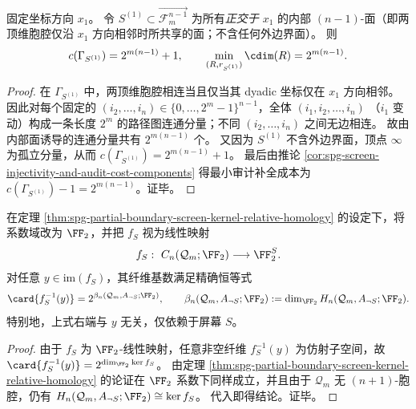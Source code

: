 \begin{proposition}\label{prop:spg-axial-screen-area-law-audit-cost}
固定坐标方向 \(x_1\)。
令 \(S^{(1)}\subset \overrightarrow{\mathcal F_{m}^{n-1}}\) 为所有\emph{正交于 \(x_1\)} 的内部 \((n-1)\)-面（即两顶维胞腔仅沿 \(x_1\) 方向相邻时所共享的面；不含任何外边界面）。
则
\[
c(\Gamma_{S^{(1)}})=2^{m(n-1)}+1,
\qquad
\min_{(R,r_{S^{(1)}})}\cdim(R)=2^{m(n-1)}.
\]
\end{proposition}
\begin{proof}
在 \(\Gamma_{S^{(1)}}\) 中，两顶维胞腔相连当且仅当其 dyadic 坐标仅在 \(x_1\) 方向相邻。
因此对每个固定的 \((i_2,\dots,i_n)\in\{0,\dots,2^m-1\}^{n-1}\)，全体
\(
(i_1,i_2,\dots,i_n)
\)
（\(i_1\) 变动）构成一条长度 \(2^m\) 的路径图连通分量；不同 \((i_2,\dots,i_n)\) 之间无边相连。
故由内部面诱导的连通分量共有 \(2^{m(n-1)}\) 个。
又因为 \(S^{(1)}\) 不含外边界面，顶点 \(\infty\) 为孤立分量，从而
\(
c(\Gamma_{S^{(1)}})=2^{m(n-1)}+1
\)。
最后由推论 \ref{cor:spg-screen-injectivity-and-audit-cost-components} 得最小审计补全成本为 \(c(\Gamma_{S^{(1)}})-1=2^{m(n-1)}\)。证毕。
\end{proof}

\begin{corollary}\label{cor:spg-partial-boundary-fiber-cardinality-f2}
在定理 \ref{thm:spg-partial-boundary-screen-kernel-relative-homology} 的设定下，将系数域改为 \(\FF_2\)，并把 \(f_S\) 视为线性映射
\[
f_S:\ C_n(\mathcal Q_m;\FF_2)\longrightarrow \FF_2^{S}.
\]
对任意 \(y\in \mathrm{im}(f_S)\)，其纤维基数满足精确恒等式
\[
\card{f_S^{-1}(y)}=2^{\beta_n(\mathcal Q_m,A_{\neg S};\FF_2)},
\qquad
\beta_n(\mathcal Q_m,A_{\neg S};\FF_2):=\dim_{\FF_2}H_n(\mathcal Q_m,A_{\neg S};\FF_2).
\]
特别地，上式右端与 \(y\) 无关，仅依赖于屏幕 \(S\)。
\end{corollary}
\begin{proof}
由于 \(f_S\) 为 \(\FF_2\)-线性映射，任意非空纤维 \(f_S^{-1}(y)\) 为仿射子空间，故
\(
\card{f_S^{-1}(y)}=2^{\dim_{\FF_2}\ker f_S}
\)。
由定理 \ref{thm:spg-partial-boundary-screen-kernel-relative-homology} 的论证在 \(\FF_2\) 系数下同样成立，并且由于 \(\mathcal Q_m\) 无 \((n+1)\)-胞腔，仍有
\(
H_n(\mathcal Q_m,A_{\neg S};\FF_2)\cong \ker f_S
\)。
代入即得结论。证毕。
\end{proof}

